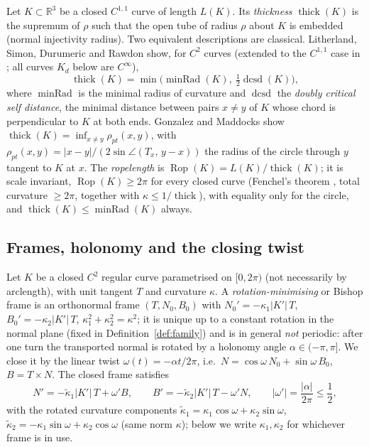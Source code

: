 \documentclass[10pt,a4paper]{article}
\theoremstyle{plain}
\theoremstyle{definition}
\theoremstyle{remark}
\newcommand{\R}{\mathbb{R}}
\newcommand{\thick}{\operatorname{thick}}
\newcommand{\Rop}{\operatorname{Rop}}
\newcommand{\minRad}{\operatorname{minRad}}
\newcommand{\dcsd}{\operatorname{dcsd}}
\begin{document}
Let $K\subset\R^3$ be a closed $C^{1,1}$ curve of length $L(K)$. Its \emph{thickness} $\thick(K)$ is the supremum of $\rho$ such that the open tube of radius $\rho$ about $K$ is embedded (normal injectivity radius). Two equivalent descriptions are classical. Litherland, Simon, Durumeric and Rawdon \cite{LSDR1999} show, for $C^2$ curves (extended to the $C^{1,1}$ case in \cite{CKS2002}; all curves $K_d$ below are $C^\infty$),
\begin{equation}\label{eq:lsdr}
\thick(K)=\min\bigl(\minRad(K),\ \tfrac12\dcsd(K)\bigr),
\end{equation}
where $\minRad$ is the minimal radius of curvature and $\dcsd$ the \emph{doubly critical self distance}, the minimal distance between pairs $x\neq y$ of $K$ whose chord is perpendicular to $K$ at both ends. Gonzalez and Maddocks \cite{GonzalezMaddocks1999} show $\thick(K)=\inf_{x\neq y}\rho_{pt}(x,y)$, with $\rho_{pt}(x,y)=|x-y|/(2\sin\angle(T_x,\,y-x))$ the radius of the circle through $y$ tangent to $K$ at $x$. The \emph{ropelength} is $\Rop(K)=L(K)/\thick(K)$; it is scale invariant, $\Rop(K)\ge 2\pi$ for every closed curve (Fenchel's theorem \cite{Fenchel1929}, total curvature $\ge2\pi$, together with $\kappa\le1/\thick$), with equality only for the circle, and $\thick(K)\le\minRad(K)$ always.

\subsection{Frames, holonomy and the closing twist}

Let $K$ be a closed $C^2$ regular curve parametrised on $[0,2\pi)$ (not necessarily by arclength), with unit tangent $T$ and curvature $\kappa$. A \emph{rotation-minimising} or Bishop frame \cite{Bishop1975} is an orthonormal frame $(T,N_0,B_0)$ with $N_0'=-\kappa_1|K'|\,T$, $B_0'=-\kappa_2|K'|\,T$, $\kappa_1^2+\kappa_2^2=\kappa^2$; it is unique up to a constant rotation in the normal plane (fixed in Definition~\ref{def:family}) and is in general \emph{not} periodic: after one turn the transported normal is rotated by a holonomy angle $\alpha\in(-\pi,\pi]$. We close it by the linear twist $\omega(t)=-\alpha t/2\pi$, i.e.\ $N=\cos\omega\,N_0+\sin\omega\,B_0$, $B=T\times N$. The closed frame satisfies
\begin{equation}\label{eq:frame}
N'=-\tilde\kappa_1|K'|\,T+\omega' B,\qquad B'=-\tilde\kappa_2|K'|\,T-\omega' N,\qquad |\omega'|=\frac{|\alpha|}{2\pi}\le\frac12 ,
\end{equation}
with the rotated curvature components $\tilde\kappa_1=\kappa_1\cos\omega+\kappa_2\sin\omega$, $\tilde\kappa_2=-\kappa_1\sin\omega+\kappa_2\cos\omega$ (same norm $\kappa$); below we write $\kappa_1,\kappa_2$ for whichever frame is in use.
\end{document}

